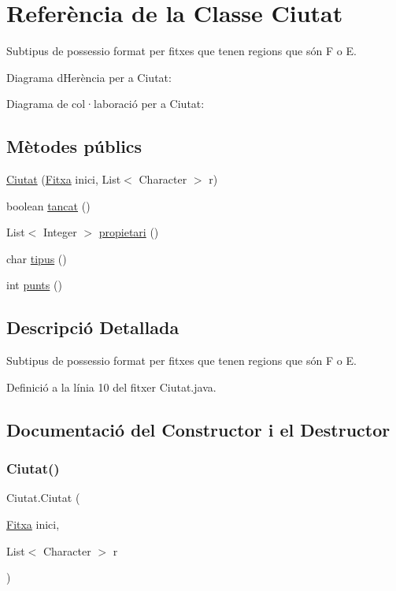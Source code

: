 \hypertarget{class_ciutat}{}\section{Referència de la Classe Ciutat}
\label{class_ciutat}


Subtipus de possessio format per fitxes que tenen regions que són F o E.  




Diagrama d\textquotesingle{}Herència per a Ciutat\+:


Diagrama de col·laboració per a Ciutat\+:
\subsection*{Mètodes públics}
\begin{DoxyCompactItemize}
\item 
\mbox{\hyperlink{class_ciutat_a5fd067425e0c21bcd18bd1ece4c5047e}{Ciutat}} (\mbox{\hyperlink{class_fitxa}{Fitxa}} inici, List$<$ Character $>$ r)
\item 
boolean \mbox{\hyperlink{class_ciutat_a427646d0239bb076543505a4d52772c2}{tancat}} ()
\item 
List$<$ Integer $>$ \mbox{\hyperlink{class_ciutat_afd286f07dc54151be32b79327f8259e9}{propietari}} ()
\item 
char \mbox{\hyperlink{class_ciutat_a3b3c22ebac4fc2ce26417016f9665cfe}{tipus}} ()
\item 
int \mbox{\hyperlink{class_ciutat_a47eb8c10d3a938b85050a1620c4d05ea}{punts}} ()
\end{DoxyCompactItemize}


\subsection{Descripció Detallada}
Subtipus de possessio format per fitxes que tenen regions que són F o E. 

Definició a la línia 10 del fitxer Ciutat.\+java.



\subsection{Documentació del Constructor i el Destructor}
\mbox{\label{class_ciutat_a5fd067425e0c21bcd18bd1ece4c5047e}} 
\subsubsection{\texorpdfstring{Ciutat()}{Ciutat()}}
{\footnotesize\ttfamily Ciutat.\+Ciutat (\begin{DoxyParamCaption}\item[{\mbox{\hyperlink{class_fitxa}{Fitxa}}}]{inici,  }\item[{List$<$ Character $>$}]{r }\end{DoxyParamCaption})}

